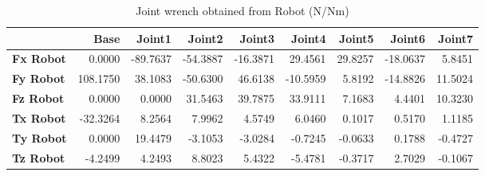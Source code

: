 \begin{table}[h!]
	\centering
	\caption{Joint wrench obtained from Robot (N/Nm)}
	\label{wrech_Robot_Pose3}
	\begin{tabular}{|l|r|r|r|r|r|r|r|r|}
		\hline
		\textbf{} & \textbf{Base} & \textbf{Joint1}  & \textbf{Joint2}  & \textbf{Joint3}  & \textbf{Joint4}  & \textbf{Joint5}  & \textbf{Joint6}  & \textbf{Joint7} \\ \hline
		\textbf{Fx Robot}  & 0.0000        & -89.7637        & -54.3887        & -16.3871        & 29.4561        & 29.8257        & -18.0637        & 5.8451 \\ \hline
		\textbf{Fy Robot}  & 108.1750        & 38.1083        & -50.6300        & 46.6138        & -10.5959        & 5.8192        & -14.8826        & 11.5024 \\ \hline
		\textbf{Fz Robot}  & 0.0000        & 0.0000        & 31.5463        & 39.7875        & 33.9111        & 7.1683        & 4.4401        & 10.3230 \\ \hline
		\textbf{Tx Robot}  & -32.3264        & 8.2564        & 7.9962        & 4.5749        & 6.0460        & 0.1017        & 0.5170        & 1.1185 \\ \hline
		\textbf{Ty Robot}  & 0.0000        & 19.4479        & -3.1053        & -3.0284        & -0.7245        & -0.0633        & 0.1788        & -0.4727 \\ \hline
		\textbf{Tz Robot}  & -4.2499        & 4.2493        & 8.8023        & 5.4322        & -5.4781        & -0.3717        & 2.7029        & -0.1067 \\ \hline
	\end{tabular}
\end{table}

